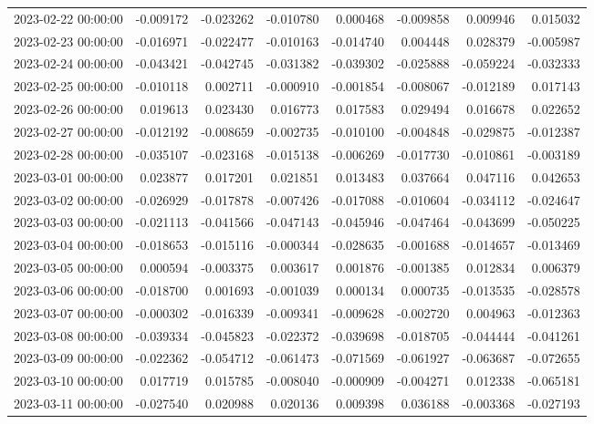 \begin{tabular}{lrrrrrrr}
2023-02-22 00:00:00 & -0.009172 & -0.023262 & -0.010780 & 0.000468 & -0.009858 & 0.009946 & 0.015032 \\
2023-02-23 00:00:00 & -0.016971 & -0.022477 & -0.010163 & -0.014740 & 0.004448 & 0.028379 & -0.005987 \\
2023-02-24 00:00:00 & -0.043421 & -0.042745 & -0.031382 & -0.039302 & -0.025888 & -0.059224 & -0.032333 \\
2023-02-25 00:00:00 & -0.010118 & 0.002711 & -0.000910 & -0.001854 & -0.008067 & -0.012189 & 0.017143 \\
2023-02-26 00:00:00 & 0.019613 & 0.023430 & 0.016773 & 0.017583 & 0.029494 & 0.016678 & 0.022652 \\
2023-02-27 00:00:00 & -0.012192 & -0.008659 & -0.002735 & -0.010100 & -0.004848 & -0.029875 & -0.012387 \\
2023-02-28 00:00:00 & -0.035107 & -0.023168 & -0.015138 & -0.006269 & -0.017730 & -0.010861 & -0.003189 \\
2023-03-01 00:00:00 & 0.023877 & 0.017201 & 0.021851 & 0.013483 & 0.037664 & 0.047116 & 0.042653 \\
2023-03-02 00:00:00 & -0.026929 & -0.017878 & -0.007426 & -0.017088 & -0.010604 & -0.034112 & -0.024647 \\
2023-03-03 00:00:00 & -0.021113 & -0.041566 & -0.047143 & -0.045946 & -0.047464 & -0.043699 & -0.050225 \\
2023-03-04 00:00:00 & -0.018653 & -0.015116 & -0.000344 & -0.028635 & -0.001688 & -0.014657 & -0.013469 \\
2023-03-05 00:00:00 & 0.000594 & -0.003375 & 0.003617 & 0.001876 & -0.001385 & 0.012834 & 0.006379 \\
2023-03-06 00:00:00 & -0.018700 & 0.001693 & -0.001039 & 0.000134 & 0.000735 & -0.013535 & -0.028578 \\
2023-03-07 00:00:00 & -0.000302 & -0.016339 & -0.009341 & -0.009628 & -0.002720 & 0.004963 & -0.012363 \\
2023-03-08 00:00:00 & -0.039334 & -0.045823 & -0.022372 & -0.039698 & -0.018705 & -0.044444 & -0.041261 \\
2023-03-09 00:00:00 & -0.022362 & -0.054712 & -0.061473 & -0.071569 & -0.061927 & -0.063687 & -0.072655 \\
2023-03-10 00:00:00 & 0.017719 & 0.015785 & -0.008040 & -0.000909 & -0.004271 & 0.012338 & -0.065181 \\
2023-03-11 00:00:00 & -0.027540 & 0.020988 & 0.020136 & 0.009398 & 0.036188 & -0.003368 & -0.027193 \\

\end{tabular}
